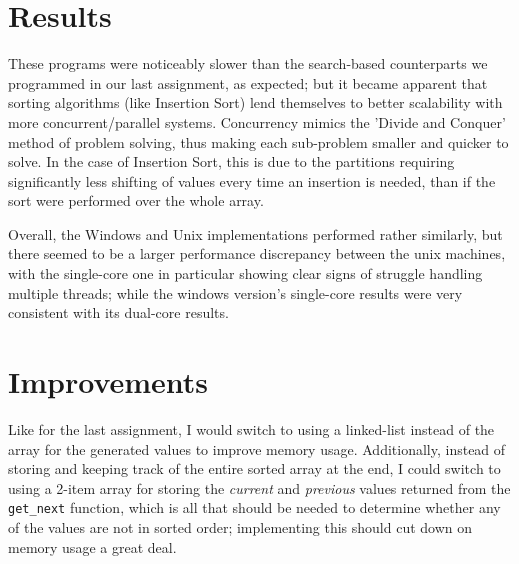 \documentclass[12pt]{article}
\begin{document}
\section*{Results}
These programs were noticeably slower than the search-based counterparts we programmed in our last assignment, as expected; but it became apparent
that sorting algorithms (like Insertion Sort) lend themselves to better scalability with more concurrent/parallel systems. Concurrency mimics
the 'Divide and Conquer' method of problem solving, thus making each sub-problem smaller and quicker to solve. In the case of Insertion Sort,
this is due to the partitions requiring significantly less shifting of values every time an insertion is needed, than if the sort were performed
over the whole array.

Overall, the Windows and Unix implementations performed rather similarly, but there seemed to be a larger performance discrepancy between the unix machines, 
with the single-core one in particular showing clear signs of struggle handling multiple threads; while the windows version's single-core results were very 
consistent with its dual-core results.


\section*{Improvements}
Like for the last assignment, I would switch to using a linked-list instead of the array for the generated values to improve memory usage. Additionally, instead of storing and keeping
track of the entire sorted array at the end, I could switch to using a 2-item array for storing the \textsl{current} and \textsl{previous} values returned from the \texttt{get\_next} function,
which is all that should be needed to determine whether any of the values are not in sorted order; implementing this should cut down on memory usage a great deal.



\end{document}
